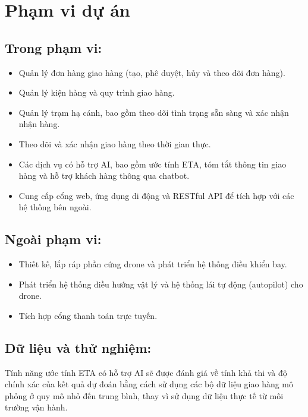 \section{Phạm vi dự án}

\subsection{Trong phạm vi:}

\begin{itemize}
\item
  Quản lý đơn hàng giao hàng (tạo, phê duyệt, hủy và theo dõi đơn hàng).
\item
  Quản lý kiện hàng và quy trình giao hàng.
\item
  Quản lý trạm hạ cánh, bao gồm theo dõi tình trạng sẵn sàng và xác nhận nhận hàng.
\item
  Theo dõi và xác nhận giao hàng theo thời gian thực.
\item
  Các dịch vụ có hỗ trợ AI, bao gồm ước tính ETA, tóm tắt thông tin giao hàng và hỗ trợ khách hàng thông qua chatbot.
\item
  Cung cấp cổng web, ứng dụng di động và RESTful API để tích hợp với các hệ thống bên ngoài.
\end{itemize}

\subsection{Ngoài phạm vi:}

\begin{itemize}
\item
  Thiết kế, lắp ráp phần cứng drone và phát triển hệ thống điều khiển bay.
\item
  Phát triển hệ thống điều hướng vật lý và hệ thống lái tự động (autopilot) cho drone.
\item
  Tích hợp cổng thanh toán trực tuyến.
\end{itemize}

\subsection{Dữ liệu và thử nghiệm:} Tính năng ước tính ETA có hỗ trợ AI sẽ được đánh giá về tính khả thi và độ chính xác của kết quả dự đoán bằng cách sử dụng các bộ dữ liệu giao hàng mô phỏng ở quy mô nhỏ đến trung bình, thay vì sử dụng dữ liệu thực tế từ môi trường vận hành.

